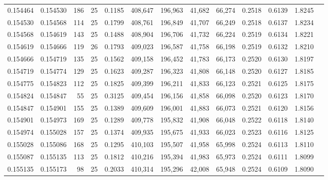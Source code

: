 \begin{tabular}{rrrrrrrrrrrrr}
0.154464 & 0.154530 &   186 &  25 &                                     0.1185 & 408,647 & 196,963 &  41,682 &  66,274 & 0.2518 & 0.6139 & 1.8245 \\
0.154530 & 0.154568 &   114 &  25 &                                     0.1799 & 408,761 & 196,849 &  41,707 &  66,249 & 0.2518 & 0.6137 & 1.8234 \\
0.154568 & 0.154619 &   143 &  25 &                                     0.1488 & 408,904 & 196,706 &  41,732 &  66,224 & 0.2519 & 0.6134 & 1.8221 \\
0.154619 & 0.154666 &   119 &  26 &                                     0.1793 & 409,023 & 196,587 &  41,758 &  66,198 & 0.2519 & 0.6132 & 1.8210 \\
0.154666 & 0.154719 &   135 &  25 &                                     0.1562 & 409,158 & 196,452 &  41,783 &  66,173 & 0.2520 & 0.6130 & 1.8197 \\
0.154719 & 0.154774 &   129 &  25 &                                     0.1623 & 409,287 & 196,323 &  41,808 &  66,148 & 0.2520 & 0.6127 & 1.8185 \\
0.154775 & 0.154823 &   112 &  25 &                                     0.1825 & 409,399 & 196,211 &  41,833 &  66,123 & 0.2521 & 0.6125 & 1.8175 \\
0.154824 & 0.154847 &    55 &  25 &                                     0.3125 & 409,454 & 196,156 &  41,858 &  66,098 & 0.2520 & 0.6123 & 1.8170 \\
0.154847 & 0.154901 &   155 &  25 &                                     0.1389 & 409,609 & 196,001 &  41,883 &  66,073 & 0.2521 & 0.6120 & 1.8156 \\
0.154901 & 0.154973 &   169 &  25 &                                     0.1289 & 409,778 & 195,832 &  41,908 &  66,048 & 0.2522 & 0.6118 & 1.8140 \\
0.154974 & 0.155028 &   157 &  25 &                                     0.1374 & 409,935 & 195,675 &  41,933 &  66,023 & 0.2523 & 0.6116 & 1.8125 \\
0.155028 & 0.155086 &   168 &  25 &                                     0.1295 & 410,103 & 195,507 &  41,958 &  65,998 & 0.2524 & 0.6113 & 1.8110 \\
0.155087 & 0.155135 &   113 &  25 &                                     0.1812 & 410,216 & 195,394 &  41,983 &  65,973 & 0.2524 & 0.6111 & 1.8099 \\
0.155135 & 0.155173 &    98 &  25 &                                     0.2033 & 410,314 & 195,296 &  42,008 &  65,948 & 0.2524 & 0.6109 & 1.8090 \\

\end{tabular}
